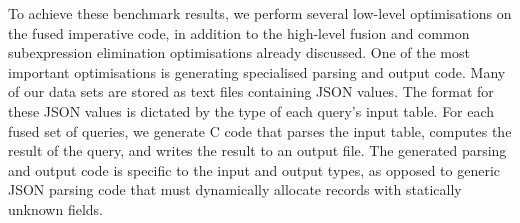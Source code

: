 To achieve these benchmark results, we perform several low-level optimisations on the fused imperative code, in addition to the high-level fusion and common subexpression elimination optimisations already discussed.
One of the most important optimisations is generating specialised parsing and output code.
Many of our data sets are stored as text files containing JSON values.
The format for these JSON values is dictated by the type of each query's input table.
For each fused set of queries, we generate C code that parses the input table, computes the result of the query, and writes the result to an output file.
The generated parsing and output code is specific to the input and output types, as opposed to generic JSON parsing code that must dynamically allocate records with statically unknown fields.



